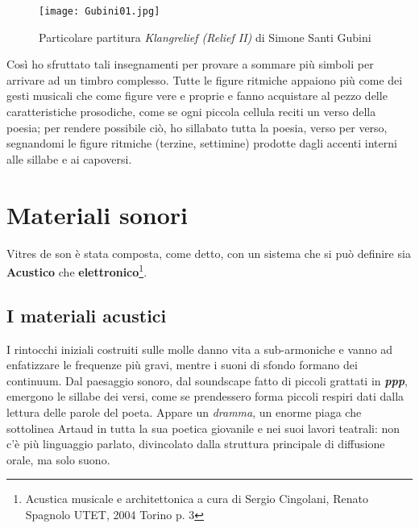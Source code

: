 \begin{figure}[htbp]
\begin{center}
\texttt{[image: Gubini01.jpg]}
\caption{Particolare partitura \textit{Klangrelief (Relief II)} di Simone Santi Gubini}
\label{default}
\end{center}
\end{figure}


Così ho sfruttato tali insegnamenti per provare a sommare più simboli per arrivare ad un timbro complesso.
Tutte le figure ritmiche appaiono più come dei gesti musicali che come figure vere e proprie e fanno acquistare al pezzo delle caratteristiche prosodiche, come se ogni piccola cellula reciti un verso della poesia; per rendere possibile ciò, ho sillabato tutta la poesia, verso per verso, segnandomi le figure ritmiche (terzine, settimine) prodotte dagli accenti interni alle sillabe e ai capoversi.

\section{Materiali sonori}

Vitres de son è stata composta, come detto, con un sistema che si può definire sia \textbf{Acustico} che \textbf{elettronico}\footnote{Acustica musicale e architettonica a cura di Sergio Cingolani, Renato Spagnolo UTET, 2004 Torino p. 3}.


\subsection*{I materiali acustici}

I rintocchi iniziali costruiti sulle molle danno vita a sub-armoniche e vanno ad enfatizzare le frequenze più gravi, mentre i suoni di sfondo formano dei continuum. Dal paesaggio sonoro, dal soundscape fatto di piccoli grattati in \textbf{\textit{ppp}}, emergono le sillabe dei versi, come se prendessero forma piccoli respiri dati dalla lettura delle parole del poeta. Appare un \textit{dramma}, un enorme piaga che sottolinea Artaud in tutta la sua poetica giovanile e nei suoi lavori teatrali: non c'è più linguaggio parlato, divincolato dalla struttura principale di diffusione orale, ma solo suono.

